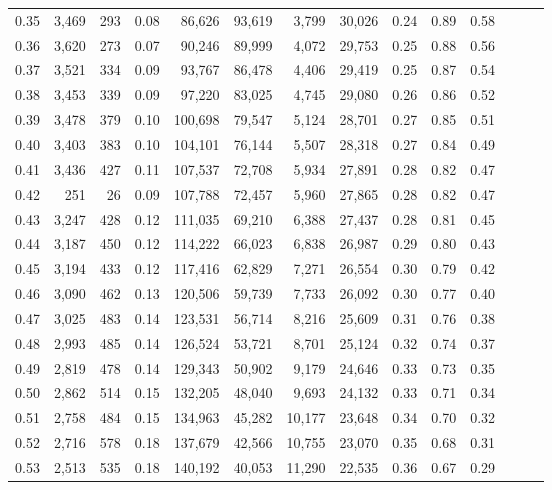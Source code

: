 \begin{tabular}{rrrrrrrrrrrrrr}
0.35 &  3,469 &  293 &  0.08 &   86,626 &   93,619 &   3,799 &  30,026 &  0.24 &  0.89 &      0.58 \\
0.36 &  3,620 &  273 &  0.07 &   90,246 &   89,999 &   4,072 &  29,753 &  0.25 &  0.88 &      0.56 \\
0.37 &  3,521 &  334 &  0.09 &   93,767 &   86,478 &   4,406 &  29,419 &  0.25 &  0.87 &      0.54 \\
0.38 &  3,453 &  339 &  0.09 &   97,220 &   83,025 &   4,745 &  29,080 &  0.26 &  0.86 &      0.52 \\
0.39 &  3,478 &  379 &  0.10 &  100,698 &   79,547 &   5,124 &  28,701 &  0.27 &  0.85 &      0.51 \\
0.40 &  3,403 &  383 &  0.10 &  104,101 &   76,144 &   5,507 &  28,318 &  0.27 &  0.84 &      0.49 \\
0.41 &  3,436 &  427 &  0.11 &  107,537 &   72,708 &   5,934 &  27,891 &  0.28 &  0.82 &      0.47 \\
0.42 &    251 &   26 &  0.09 &  107,788 &   72,457 &   5,960 &  27,865 &  0.28 &  0.82 &      0.47 \\
0.43 &  3,247 &  428 &  0.12 &  111,035 &   69,210 &   6,388 &  27,437 &  0.28 &  0.81 &      0.45 \\
0.44 &  3,187 &  450 &  0.12 &  114,222 &   66,023 &   6,838 &  26,987 &  0.29 &  0.80 &      0.43 \\
0.45 &  3,194 &  433 &  0.12 &  117,416 &   62,829 &   7,271 &  26,554 &  0.30 &  0.79 &      0.42 \\
0.46 &  3,090 &  462 &  0.13 &  120,506 &   59,739 &   7,733 &  26,092 &  0.30 &  0.77 &      0.40 \\
0.47 &  3,025 &  483 &  0.14 &  123,531 &   56,714 &   8,216 &  25,609 &  0.31 &  0.76 &      0.38 \\
0.48 &  2,993 &  485 &  0.14 &  126,524 &   53,721 &   8,701 &  25,124 &  0.32 &  0.74 &      0.37 \\
0.49 &  2,819 &  478 &  0.14 &  129,343 &   50,902 &   9,179 &  24,646 &  0.33 &  0.73 &      0.35 \\
0.50 &  2,862 &  514 &  0.15 &  132,205 &   48,040 &   9,693 &  24,132 &  0.33 &  0.71 &      0.34 \\
0.51 &  2,758 &  484 &  0.15 &  134,963 &   45,282 &  10,177 &  23,648 &  0.34 &  0.70 &      0.32 \\
0.52 &  2,716 &  578 &  0.18 &  137,679 &   42,566 &  10,755 &  23,070 &  0.35 &  0.68 &      0.31 \\
0.53 &  2,513 &  535 &  0.18 &  140,192 &   40,053 &  11,290 &  22,535 &  0.36 &  0.67 &      0.29 \\

\end{tabular}
